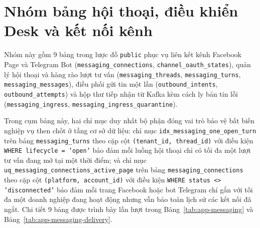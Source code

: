 \section{Nhóm bảng hội thoại, điều khiển Desk và kết nối kênh}
Nhóm này gồm 9 bảng trong lược đồ \texttt{public} phục vụ liên kết kênh Facebook Page và Telegram Bot (\texttt{messaging\_\hspace{0pt}connections}, \texttt{channel\_\hspace{0pt}oauth\_\hspace{0pt}states}), quản lý hội thoại và hàng rào lượt tư vấn (\texttt{messaging\_\hspace{0pt}threads}, \texttt{messaging\_\hspace{0pt}turns}, \texttt{messaging\_\hspace{0pt}messages}), điều phối gửi tin một lần (\texttt{outbound\_\hspace{0pt}intents}, \texttt{outbound\_\hspace{0pt}attempts}) và hộp thư tiếp nhận từ Kafka kèm cách ly bản tin lỗi (\texttt{messaging\_\hspace{0pt}ingress}, \texttt{messaging\_\hspace{0pt}ingress\_\hspace{0pt}quarantine}).

Trong cụm bảng này, hai chỉ mục duy nhất bộ phận đóng vai trò bảo vệ bất biến nghiệp vụ then chốt ở tầng cơ sở dữ liệu: chỉ mục \texttt{idx\_\hspace{0pt}messaging\_\hspace{0pt}one\_\hspace{0pt}open\_\hspace{0pt}turn} trên bảng \texttt{messaging\_\hspace{0pt}turns} theo cặp cột \texttt{(tenant\_\hspace{0pt}id, thread\_\hspace{0pt}id)} với điều kiện \texttt{WHERE lifecycle = 'open'} bảo đảm mỗi luồng hội thoại chỉ có tối đa một lượt tư vấn đang mở tại một thời điểm; và chỉ mục \texttt{uq\_\hspace{0pt}messaging\_\hspace{0pt}connections\_\hspace{0pt}active\_\hspace{0pt}page} trên bảng \texttt{messaging\_\hspace{0pt}connections} theo cặp cột \texttt{(platform, account\_\hspace{0pt}id)} với điều kiện \texttt{WHERE status <> 'disconnected'} bảo đảm mỗi trang Facebook hoặc bot Telegram chỉ gắn với tối đa một doanh nghiệp đang hoạt động nhưng vẫn bảo toàn lịch sử các kết nối đã ngắt. Chi tiết 9 bảng được trình bày lần lượt trong Bảng~\ref{tab:app-messaging} và Bảng~\ref{tab:app-messaging-delivery}.

